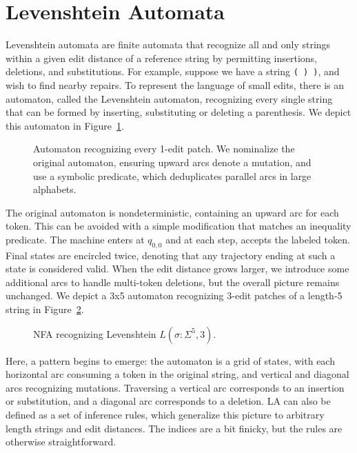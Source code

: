 \section{Levenshtein Automata}

Levenshtein automata are finite automata that recognize all and only strings within a given edit distance of a reference string by permitting insertions, deletions, and substitutions. For example, suppose we have a string \texttt{( ) )}, and wish to find nearby repairs. To represent the language of small edits, there is an automaton, called the Levenshtein automaton, recognizing every single string that can be formed by inserting, substituting or deleting a parenthesis. We depict this automaton in Figure~\ref{fig:lev_automaton}.

\begin{figure}[h!]
  
  \caption{Automaton recognizing every 1-edit patch. We nominalize the original automaton, ensuring upward arcs denote a mutation, and use a symbolic predicate, which deduplicates parallel arcs in large alphabets.}\label{fig:lev_automaton}\vspace{-5pt}
\end{figure}

The original automaton is nondeterministic, containing an upward arc for each token. This can be avoided with a simple modification that matches an inequality predicate. The machine enters at $q_{0, 0}$ and at each step, accepts the labeled token. Final states are encircled twice, denoting that any trajectory ending at such a state is considered valid.
When the edit distance grows larger, we introduce some additional arcs to handle multi-token deletions, but the overall picture remains unchanged. We depict a 3x5 automaton recognizing 3-edit patches of a length-5 string in Figure~\ref{fig:lev_nfa}.

\begin{figure}
  \begin{center}
    
  \end{center}
  \caption{NFA recognizing Levenshtein $L(\sigma: \Sigma^5, 3)$.}\label{fig:lev_nfa}
\end{figure}

Here, a pattern begins to emerge: the automaton is a grid of states, with each horizontal arc consuming a token in the original string, and vertical and diagonal arcs recognizing mutations. Traversing a vertical arc corresponds to an insertion or substitution, and a diagonal arc corresponds to a deletion. LA can also be defined as a set of inference rules, which generalize this picture to arbitrary length strings and edit distances. The indices are a bit finicky, but the rules are otherwise straightforward.

